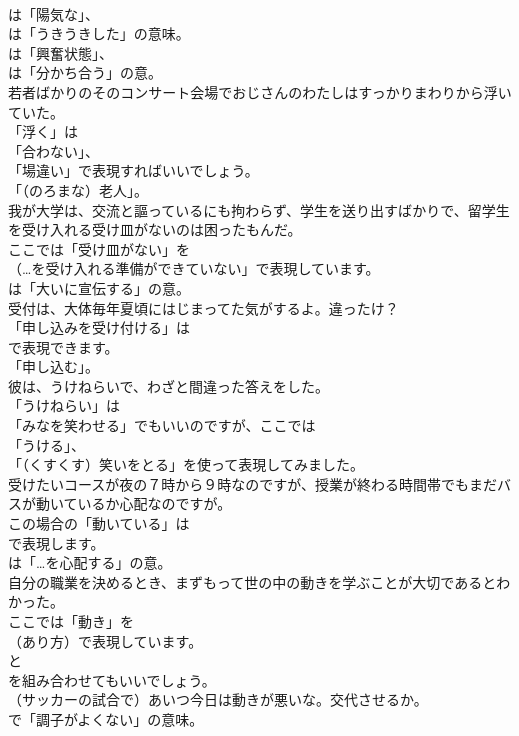 \documentclass[8pt]{extreport}
\begin{document}
\begin{CJK}{UTF8}{min}
\\	は「陽気な」、
\\	は「うきうきした」の意味。
\\	は「興奮状態」、
\\	は「分かち合う」の意。	
\\	若者ばかりのそのコンサート会場でおじさんのわたしはすっかりまわりから浮いていた。 
\\	「浮く」は
\\	「合わない」、
\\	「場違い」で表現すればいいでしょう。
\\	「（のろまな）老人」。	
\\	我が大学は、交流と謳っているにも拘わらず、学生を送り出すばかりで、留学生を受け入れる受け皿がないのは困ったもんだ。 
\\	ここでは「受け皿がない」を
\\	（…を受け入れる準備ができていない」で表現しています。
\\	は「大いに宣伝する」の意。	
\\	受付は、大体毎年夏頃にはじまってた気がするよ。違ったけ？ 
\\	「申し込みを受け付ける」は
\\	で表現できます。
\\	「申し込む」。	
\\	彼は、うけねらいで、わざと間違った答えをした。 
\\	「うけねらい」は
\\	「みなを笑わせる」でもいいのですが、ここでは
\\	「うける」、
\\	「（くすくす）笑いをとる」を使って表現してみました。	
\\	受けたいコースが夜の７時から９時なのですが、授業が終わる時間帯でもまだバスが動いているか心配なのですが。 
\\	この場合の「動いている」は 
\\	で表現します。
\\	は「…を心配する」の意。	
\\	自分の職業を決めるとき、まずもって世の中の動きを学ぶことが大切であるとわかった。 
\\	ここでは「動き」を 
\\	（あり方）で表現しています。
\\	と 
\\	を組み合わせてもいいでしょう。	
\\	（サッカーの試合で）あいつ今日は動きが悪いな。交代させるか。 
\\	で「調子がよくない」の意味。

\end{CJK}
\end{document}
